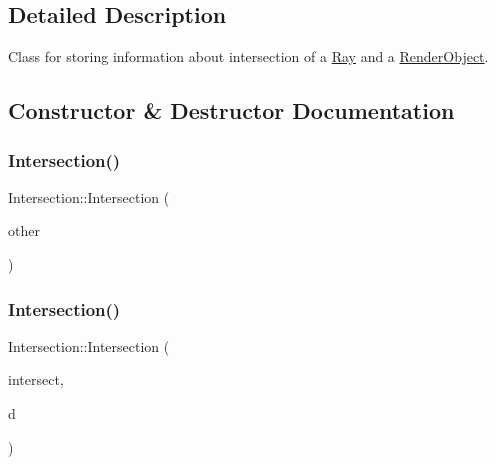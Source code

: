 \subsection{Detailed Description}
Class for storing information about intersection of a \mbox{\hyperlink{classRay}{Ray}} and a \mbox{\hyperlink{classRenderObject}{Render\+Object}}. 

\subsection{Constructor \& Destructor Documentation}
\mbox{\label{classIntersection_a6d6042fc104b258908c3c55d7cc23aa3}} 
\subsubsection{\texorpdfstring{Intersection()}{Intersection()}\hspace{0.1cm}{\footnotesize\ttfamily [1/4]}}
{\footnotesize\ttfamily Intersection\+::\+Intersection (\begin{DoxyParamCaption}\item[{const \mbox{\hyperlink{classIntersection}{Intersection}} \&}]{other }\end{DoxyParamCaption})}

\mbox{\label{classIntersection_accfff54844dea1b64fce8ddb1c72f84d}} 
\subsubsection{\texorpdfstring{Intersection()}{Intersection()}\hspace{0.1cm}{\footnotesize\ttfamily [2/4]}}
{\footnotesize\ttfamily Intersection\+::\+Intersection (\begin{DoxyParamCaption}\item[{const \mbox{\hyperlink{classRenderObject}{Render\+Object}} $\ast$}]{intersect,  }\item[{const double \&}]{d }\end{DoxyParamCaption})}

\mbox{\label{classIntersection_a8c9336839207202dbd7cc8eef633272e}} 
